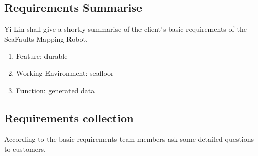 \documentclass[11pt, a4paper]{article}
\begin{document}
\subsection{Requirements Summarise }
Yi Lin shall give a shortly summarise of the client's basic requirements of the SeaFaults Mapping Robot. 

\begin{enumerate}
\item Feature: durable
\item Working Environment: seafloor
\item Function: generated data
\end{enumerate}

\subsection{Requirements collection}
According to the basic requirements team members ask some detailed questions to customers.
\end{document}
